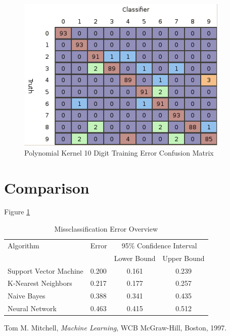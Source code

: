\documentclass{article}
\begin{document}
\begin{figure}
\centering
\includegraphics[width=0.9\textwidth]{images/poly_all_confusion_training.png}
\caption{Polynomial Kernel 10 Digit Training Error Confusion Matrix}
\label{poly10trainconfusion}
\end{figure}

\section{Comparison}\label{Comparison}

Figure \ref{error3}

\begin{table}
\caption{Missclassification Error Overview}
\begin{center}
\begin{tabular}{llcc}
\toprule
Algorithm & Error & \multicolumn{2}{c}{95\% Confidence Interval} \\
\cmidrule(r){3-4}
& & Lower Bound & Upper Bound \\
\midrule
Support Vector Machine & 0.200 & 0.161 & 0.239 \\
K-Nearest Neighbors & 0.217 & 0.177 & 0.257 \\
Naive Bayes & 0.388 &  0.341 & 0.435  \\
Neural Network & 0.463 &  0.415 & 0.512  \\
\bottomrule
\end{tabular}
\label{error3}
\end{center}
\end{table}




\begin{thebibliography}{9}

  Tom M. Mitchell,
  \emph{Machine Learning},
  WCB McGraw-Hill, Boston,
  1997.

\end{thebibliography}
\end{document}
